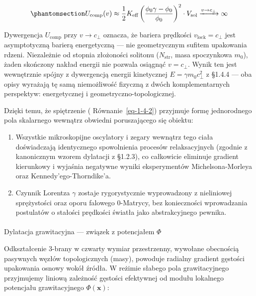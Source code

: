 \documentclass[
  polish,
  letterpaper,
  DIV=11,
  numbers=noendperiod,
  oneside]{scrartcl}
\makeatletter
\let\oldparagraph\paragraph
\renewcommand{\paragraph}{
    \@ifstar
      \xxxParagraphStar
      \xxxParagraphNoStar
  }
\newcommand{\xxxParagraphStar}[1]{\oldparagraph*{#1}\mbox{}}
\newcommand{\xxxParagraphNoStar}[1]{\oldparagraph{#1}\mbox{}}
\makeatother
\begin{document}
\begin{equation}\protect\phantomsection\label{eq-1-4-2b}{U_\text{comp}(v) \approx \frac{1}{2}K_\text{eff}\left(\frac{\phi_0\gamma - \phi_0}{\phi_0}\right)^2 \cdot V_\text{sol} \xrightarrow{v \to c_\perp} \infty}\end{equation}

Dywergencja \(U_\text{comp}\) przy \(v\to c_\perp\) oznacza, że bariera
prędkości \(v_\text{lock} = c_\perp\) jest asymptotyczną barierą
energetyczną --- nie geometrycznym sufitem upakowania rdzeni.
Niezależnie od stopnia złożoności solitonu (\(N_\text{str}\), masa
spoczynkowa \(m_0\)), żaden skończony nakład energii nie pozwala
osiągnąć \(v=c_\perp\). Wynik ten jest wewnętrznie spójny z dywergencją
energii kinetycznej \(E=\gamma m_0 c_\perp^2\) z §1.4.4 --- oba opisy
wyrażają tę samą niemożliwość fizyczną z dwóch komplementarnych
perspektyw: energetycznej i geometryczno-topologicznej.

Dzięki temu, że spiętrzenie ( Równanie~\ref{eq-1-4-2}) przyjmuje formę
jednorodnego pola skalarnego wewnątrz obwiedni poruszającego się
obiektu:

\begin{enumerate}
\def\labelenumi{\arabic{enumi}.}
\item
  Wszystkie mikroskopijne oscylatory i zegary wewnątrz tego ciała
  doświadczają identycznego spowolnienia procesów relaksacyjnych
  (zgodnie z kanonicznym wzorem dylatacji z §1.2.3), co całkowicie
  eliminuje gradient kierunkowy i wyjaśnia negatywne wyniki
  eksperymentów Michelsona-Morleya oraz Kennedy'ego-Thorndike'a.
\item
  Czynnik Lorentza \(\gamma\) zostaje rygorystycznie wyprowadzony z
  nieliniowej sprężystości oraz oporu falowego 0-Matrycy, bez
  konieczności wprowadzania postulatów o stałości prędkości światła jako
  abstrakcyjnego pewnika.
\end{enumerate}

\paragraph{\texorpdfstring{Dylatacja grawitacyjna --- związek z
potencjałem
\(\Phi\)}{Dylatacja grawitacyjna --- związek z potencjałem \textbackslash Phi}}\label{sec-1-4-3-1}

Odkształcenie 3-brany w czwarty wymiar przestrzenny, wywołane obecnością
pasywnych węzłów topologicznych (masy), powoduje radialny gradient
gęstości upakowania osnowy wokół źródła. W reżimie słabego pola
grawitacyjnego przyjmujemy liniową zależność gęstości efektywnej od
modułu lokalnego potencjału grawitacyjnego \(\Phi(\mathbf{x})\):
\end{document}
